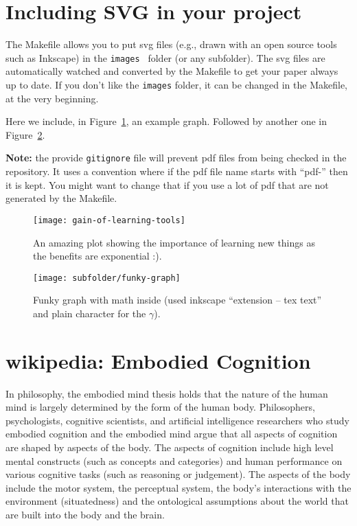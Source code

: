 \section{Including SVG in your project}
\label{svg}
The Makefile allows you to put svg files (e.g., drawn with an open source tools such as Inkscape) in the {\tt images } folder (or any subfolder).
The svg files are automatically watched and converted by the Makefile to get your paper always up to date.
If you don't like the {\tt images} folder, it can be changed in the Makefile, at the very beginning.

Here we include, in Figure~\ref{fig:gain}, an example graph. Followed by another one in Figure~\ref{fig:funky}.

{\bf Note:} the provide {\tt gitignore} file will prevent pdf files from being checked in the repository.
It uses a convention where if the pdf file name starts with ``pdf-'' then it is kept.
You might want to change that if you use a lot of pdf that are not generated by the Makefile.

\begin{figure}[t]
\begin{center}
\texttt{[image: gain-of-learning-tools]}
\end{center}
\caption{
  An amazing plot showing the importance of learning new things as the benefits are exponential :).
}
\label{fig:gain}
\end{figure}

\begin{figure}[t]
\begin{center}
\texttt{[image: subfolder/funky-graph]}
\end{center}
\caption{
  Funky graph with math inside (used inkscape ``extension -- tex text'' and plain character for the $\gamma$).
}
\label{fig:funky}
\end{figure}

\section{wikipedia: Embodied Cognition}
\label{sec:embodiement}
In philosophy, the embodied mind thesis holds that the nature of the human mind is largely determined by the form of the human body.
Philosophers, psychologists, cognitive scientists, and artificial intelligence researchers who study embodied cognition and the embodied mind argue that all aspects of cognition are shaped by aspects of the body.
The aspects of cognition include high level mental constructs (such as concepts and categories) and human performance on various cognitive tasks (such as reasoning or judgement).
The aspects of the body include the motor system, the perceptual system, the body's interactions with the environment (situatedness) and the ontological assumptions about the world that are built into the body and the brain.

